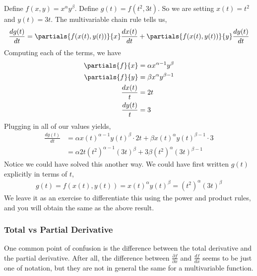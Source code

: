 \begin{example*}
    Define $f(x, y) = x^{\alpha}y^{\beta}$. Define $g(t) = f(t^2, 3t)$. So we are setting $x(t) = t^2$ and $y(t) = 3t$. The multivariable chain rule tells us,
    \begin{align*}
        \frac{dg(t)}{dt} = \partials{f(x(t), y(t))}{x} \frac{dx(t)}{dt} + \partials{f(x(t), y(t))}{y} \frac{dy(t)}{dt}
    \end{align*}
    Computing each of the terms, we have
    \begin{align*}
        \partials{f}{x} &= \alpha x^{\alpha - 1} y^{\beta} \\
        \partials{f}{y} &= \beta x^\alpha y^{\beta - 1} \\
        \frac{dx(t)}{t} &= 2t \\
        \frac{dy(t)}{t} &= 3
    \end{align*}
    Plugging in all of our values yields,
    \begin{align*}
        \frac{dg(t)}{dt} &= \alpha x(t)^{\alpha - 1} y(t)^{\beta} \cdot 2t + \beta x(t)^\alpha y(t)^{\beta - 1} \cdot 3 \\
        &= \alpha 2t (t^2)^{\alpha - 1} (3t)^{\beta} + 3 \beta (t^2)^\alpha (3t)^{\beta - 1}
    \end{align*}
    Notice we could have solved this another way. We could have first written $g(t)$ explicitly in terms of $t$,
    \begin{align*}
        g(t) = f(x(t), y(t)) = x(t)^\alpha y(t)^\beta = (t^2)^\alpha (3t)^\beta
    \end{align*}
    We leave it as an exercise to differentiate this using the power and product rules, and you will obtain the same as the above result.
\end{example*}

\subsubsection*{Total vs Partial Derivative}
One common point of confusion is the difference between the total derivative and the partial derivative. After all, the difference between $\frac{\partial f}{\partial x}$ and $\frac{d f}{d x}$ seems to be just one of notation, but they are not in general the same for a multivariable function. 

